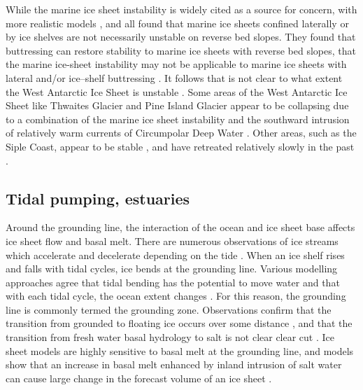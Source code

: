 While the marine ice sheet instability is widely cited as a source for concern, with more realistic models \cite{haseloff2018effect}, \cite{gudmundsson2013ice} and \cite{jamieson2012ice} all found that marine ice sheets confined laterally or by ice shelves are not necessarily unstable on reverse bed slopes. They found that buttressing can restore stability to marine ice sheets with reverse bed slopes, that the marine ice-sheet instability may not be applicable to marine ice sheets with lateral and/or ice--shelf buttressing \citep{haseloff2018effect}. It follows that is not clear to what extent the West Antarctic Ice Sheet is  unstable \citep{vaughan2008west}. Some areas of the West Antarctic Ice Sheet like Thwaites Glacier and Pine Island Glacier appear to be collapsing  due to a combination of the marine ice sheet instability and the southward intrusion of relatively warm currents of Circumpolar Deep Water \citep{ favier2014retreat, joughin2014marine}. Other areas, such as the Siple Coast, appear to be stable \citep{hindmarsh1996stability}, and have retreated relatively slowly in the past \citep{conway1999past}.


\subsection{Tidal pumping, estuaries}
Around the grounding line, the interaction of the ocean and ice sheet base affects ice sheet flow and basal melt.
There are numerous observations of ice streams which accelerate and decelerate depending on the tide \cite[e.g.][]{winberry2009basal,anandakrishnan2003ice}. 
When an ice shelf rises and falls with tidal cycles, ice bends at the grounding line. Various modelling approaches agree that tidal bending has the potential to move water and that with each tidal cycle, the ocean extent changes  \citep{sayag2013elastic,walker2013ice}. 
For this reason, the grounding line is commonly termed the grounding zone. Observations confirm that the transition from grounded to floating ice occurs over some distance \cite[e.g.][]{brunt2019assessment}, and that the transition from fresh water basal hydrology to salt is not clear clear cut \cite[e.g.][]{christianson2016basal}.
Ice sheet models are highly sensitive to basal melt at the grounding line, and models show that an increase in basal melt enhanced by inland intrusion of salt water can cause large change in the forecast volume of an ice sheet \citep{robel2022layered}.


